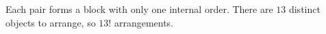 Each pair forms a block with only one internal order. There are $13$ distinct objects to arrange, so $\boxed{13!}$ arrangements.
